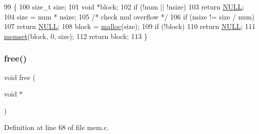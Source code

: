 \begin{DoxyCode}
99 \{
100     \textcolor{keywordtype}{size\_t} size;
101     \textcolor{keywordtype}{void} *block;
102     \textcolor{keywordflow}{if} (!num || !nsize)
103         \textcolor{keywordflow}{return} \hyperlink{a00134_a070d2ce7b6bb7e5c05602aa8c308d0c4_a070d2ce7b6bb7e5c05602aa8c308d0c4}{NULL};
104     size = num * nsize;
105     \textcolor{comment}{/* check mul overflow */}
106     \textcolor{keywordflow}{if} (nsize != size / num)
107         \textcolor{keywordflow}{return} \hyperlink{a00134_a070d2ce7b6bb7e5c05602aa8c308d0c4_a070d2ce7b6bb7e5c05602aa8c308d0c4}{NULL};
108     block = \hyperlink{a00161_a7ac38fce3243a7dcf448301ee9ffd392_a7ac38fce3243a7dcf448301ee9ffd392}{malloc}(size);
109     \textcolor{keywordflow}{if} (!block)
110         \textcolor{keywordflow}{return} \hyperlink{a00134_a070d2ce7b6bb7e5c05602aa8c308d0c4_a070d2ce7b6bb7e5c05602aa8c308d0c4}{NULL};
111     \hyperlink{a00125_a9e432f267691eceb2e2e0efcc37efbc9_a9e432f267691eceb2e2e0efcc37efbc9}{memset}(block, 0, size);
112     \textcolor{keywordflow}{return} block;
113 \}
\end{DoxyCode}
\mbox{\label{a00164_af07d89f5ceaea0c7c8252cc41fd75f37_af07d89f5ceaea0c7c8252cc41fd75f37}} 
\subsubsection{\texorpdfstring{free()}{free()}}
{\footnotesize\ttfamily void free (\begin{DoxyParamCaption}\item[{void $\ast$}]{ }\end{DoxyParamCaption})}



Definition at line 68 of file mem.\+c.


